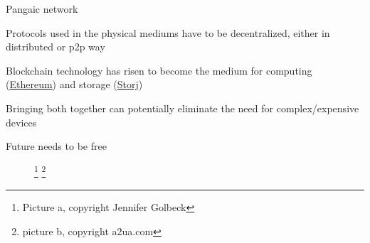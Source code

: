 \documentclass[14pt]{beamer}
\begin{document}
\begin{frame}{Pangaic network}
 \begin{fullpageitemize}
\item 
	\begin{center}
Protocols used in the physical mediums have to be decentralized, either in distributed or p2p way
    \end{center}
\item 
	\begin{center}
Blockchain technology has risen to become the medium for computing (\href{https://www.ethereum.org/}{Ethereum}) and storage (\href{https://storj.io/}{Storj})
    \end{center}
\item 
	\begin{center}
Bringing both together can potentially eliminate the need for complex/expensive devices
    \end{center}

 \end{fullpageitemize}
\end{frame}

\begin{frame}{Future needs to be free}
\begin{figure}%
    \footnote{Picture a, copyright Jennifer Golbeck}%
    \qquad
    \footnote{picture b, copyright a2ua.com}%
    \label{fig:example}%
\end{figure}
\end{frame}
\end{document}
